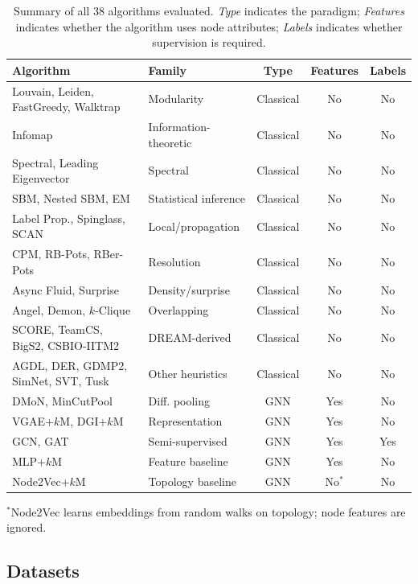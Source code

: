 \documentclass[11pt]{article}
\begin{document}
\begin{table}[t]
\centering
\caption{Summary of all 38 algorithms evaluated. \emph{Type} indicates the paradigm; \emph{Features} indicates whether the algorithm uses node attributes; \emph{Labels} indicates whether supervision is required.}
\label{tab:algorithms}
\small
\begin{tabular}{llccc}
\toprule
\textbf{Algorithm} & \textbf{Family} & \textbf{Type} & \textbf{Features} & \textbf{Labels} \\
\midrule
Louvain, Leiden, FastGreedy, Walktrap & Modularity & Classical & No & No \\
Infomap & Information-theoretic & Classical & No & No \\
Spectral, Leading Eigenvector & Spectral & Classical & No & No \\
SBM, Nested SBM, EM & Statistical inference & Classical & No & No \\
Label Prop., Spinglass, SCAN & Local/propagation & Classical & No & No \\
CPM, RB-Pots, RBer-Pots & Resolution & Classical & No & No \\
Async Fluid, Surprise & Density/surprise & Classical & No & No \\
Angel, Demon, $k$-Clique & Overlapping & Classical & No & No \\
SCORE, TeamCS, BigS2, CSBIO-IITM2 & DREAM-derived & Classical & No & No \\
AGDL, DER, GDMP2, SimNet, SVT, Tusk & Other heuristics & Classical & No & No \\
\midrule
DMoN, MinCutPool & Diff. pooling & GNN & Yes & No \\
VGAE+$k$M, DGI+$k$M & Representation & GNN & Yes & No \\
GCN, GAT & Semi-supervised & GNN & Yes & Yes \\
MLP+$k$M & Feature baseline & GNN & Yes & No \\
Node2Vec+$k$M & Topology baseline & GNN & No$^*$ & No \\
\bottomrule
\end{tabular}

\vspace{2pt}
{\footnotesize $^*$Node2Vec learns embeddings from random walks on topology; node features are ignored.}
\end{table}


\subsection{Datasets}
\label{sec:datasets}
\end{document}

